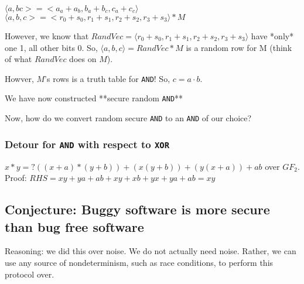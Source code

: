 \documentclass[11pt]{article}
\begin{document}
$\langle a, b c> = <a_a + a_b, b_a + b_c, c_a + c_c \rangle$
$\langle a, b, c> = <r_0 + s_0, r_1 + s_1, r_2 + s_2, r_3 + s_3 \rangle * M$

However, we know that $RandVec = \langle r_0 + s_0, r_1 + s_1, r_2 + s_2, r_3 + s_3 \rangle$ have *only* one 1, all other bits 0.
So, $\langle a, b, c \rangle = RandVec * M$ is a random row for M (think of what $RandVec$ does on $M$).

Howver, $M$'s rows is a truth table for \texttt{AND}! So, $c = a \cdot b$.

We have now constructed **secure random \texttt{AND}**


Now, how do we convert random secure \texttt{AND} to an \texttt{AND} of our choice?




\subsubsection{Detour for \texttt{AND} with respect to \texttt{XOR}}
$x * y =? ((x + a) * (y + b)) + (x(y + b)) + (y(x + a)) + ab$ over $GF_2$.
Proof:
$RHS = xy + ya + ab + xy + xb + yx + ya + ab = xy$



\subsection{Conjecture: Buggy software is more secure than bug free software}

Reasoning: we did this over noise. We do not actually need noise. Rather, we can
use any source of nondeterminism, such as race conditions, to perform this protocol over.
\end{document}
